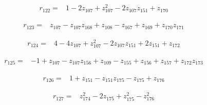 \par\noindent\begin{minipage}{\linewidth}
\begin{align*}
r_{122}={}&1-2z_{107}+z_{107}^{2}-2z_{107}z_{151}+z_{170}
\end{align*}
\end{minipage}\par
\par\noindent\begin{minipage}{\linewidth}
\begin{align*}
r_{123}={}&z_{107}-z_{107}z_{168}+z_{108}-z_{167}+z_{169}+z_{170}z_{171}
\end{align*}
\end{minipage}\par
\par\noindent\begin{minipage}{\linewidth}
\begin{align*}
r_{124}={}&4-4z_{107}+z_{107}^{2}-2z_{107}z_{151}+2z_{151}+z_{172}
\end{align*}
\end{minipage}\par
\par\noindent\begin{minipage}{\linewidth}
\begin{align*}
r_{125}={}&-1+z_{107}-z_{107}z_{156}+z_{109}-z_{155}+z_{156}+z_{157}+z_{172}z_{173}
\end{align*}
\end{minipage}\par
\par\noindent\begin{minipage}{\linewidth}
\begin{align*}
r_{126}={}&1+z_{151}-z_{151}z_{175}-z_{175}+z_{176}
\end{align*}
\end{minipage}\par
\par\noindent\begin{minipage}{\linewidth}
\begin{align*}
r_{127}={}&z_{174}^{2}-2z_{175}+z_{175}^{2}-z_{176}^{2}
\end{align*}
\end{minipage}\par
